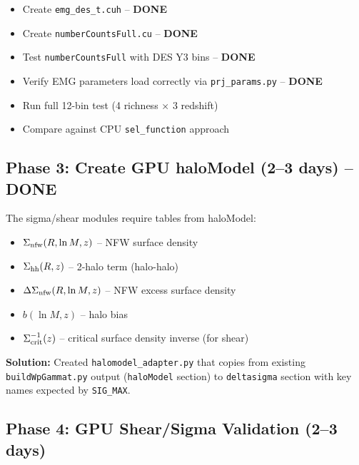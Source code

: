 \documentclass[a4paper, 11pt]{article}
\begin{document}
\begin{itemize}
  \item[\textcolor{green!50!black}{$\checkmark$}] Create \texttt{emg\_des\_t.cuh} -- \textbf{DONE}
  \item[\textcolor{green!50!black}{$\checkmark$}] Create \texttt{numberCountsFull.cu} -- \textbf{DONE}
  \item[\textcolor{green!50!black}{$\checkmark$}] Test \texttt{numberCountsFull} with DES Y3 bins -- \textbf{DONE}
  \item[\textcolor{green!50!black}{$\checkmark$}] Verify EMG parameters load correctly via \texttt{prj\_params.py} -- \textbf{DONE}
  \item[$\square$] Run full 12-bin test (4 richness $\times$ 3 redshift)
  \item[$\square$] Compare against CPU \texttt{sel\_function} approach
\end{itemize}

\subsection{Phase 3: Create GPU haloModel (2--3 days) -- DONE}

The sigma/shear modules require tables from haloModel:
\begin{itemize}
  \item[\textcolor{green!50!black}{$\checkmark$}] $\Sigma_{\rm nfw}(R, \ln M, z)$ -- NFW surface density
  \item[\textcolor{green!50!black}{$\checkmark$}] $\Sigma_{\rm hh}(R, z)$ -- 2-halo term (halo-halo)
  \item[\textcolor{green!50!black}{$\checkmark$}] $\Delta\Sigma_{\rm nfw}(R, \ln M, z)$ -- NFW excess surface density
  \item[\textcolor{green!50!black}{$\checkmark$}] $b(\ln M, z)$ -- halo bias
  \item[$\square$] $\Sigma_{\rm crit}^{-1}(z)$ -- critical surface density inverse (for shear)
\end{itemize}

\textbf{Solution:} Created \texttt{halomodel\_adapter.py} that copies from existing \texttt{buildWpGammat.py} output (\texttt{haloModel} section) to \texttt{deltasigma} section with key names expected by \texttt{SIG\_MAX}.

\subsection{Phase 4: GPU Shear/Sigma Validation (2--3 days)}
\end{document}
